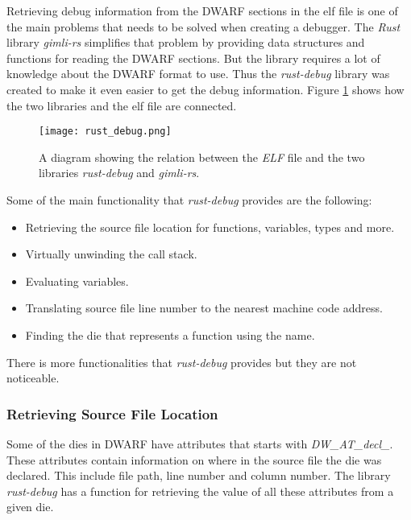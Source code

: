 
Retrieving debug information from the \gls{DWARF} sections in the \gls{elf} file is one of the main problems that needs to be solved when creating a debugger.
The \emph{Rust} library \emph{gimli-rs} simplifies that problem by providing data structures and functions for reading the \gls{DWARF} sections.
But the library requires a lot of knowledge about the \gls{DWARF} format to use.
Thus the \emph{rust-debug} library was created to make it even easier to get the debug information.
Figure \ref{fig:rustdebug} shows how the two libraries and the \gls{elf} file are connected.


\begin{figure}[h]
	\centering
	\texttt{[image: rust\_debug.png]}
	\caption{A diagram showing the relation between the \emph{ELF} file and the two libraries \emph{rust-debug} and \emph{gimli-rs}.}
	\label{fig:rustdebug}
\end{figure}


Some of the main functionality that \emph{rust-debug} provides are the following:

\begin{itemize}
  \item Retrieving the source file location for functions, variables, types and more.
  \item Virtually unwinding the call stack.
  \item Evaluating variables.
  \item Translating source file line number to the nearest machine code address.
  \item Finding the \gls{die} that represents a function using the name.
\end{itemize}

There is more functionalities that \emph{rust-debug} provides but they are not noticeable.



\subsubsection{Retrieving Source File Location}
Some of the \glspl{die} in \gls{DWARF} have attributes that starts with \emph{DW\_AT\_decl\_}.
These attributes contain information on where in the source file the \gls{die} was declared.
This include file path, line number and column number.
The library \emph{rust-debug} has a function for retrieving the value of all these attributes from a given \gls{die}.


